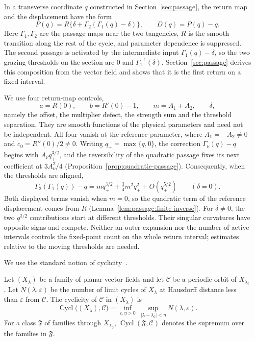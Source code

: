 In a transverse coordinate $q$ constructed in Section~\ref{sec:passage}, the
return map and the displacement have the form
\[
 P(q)=R\{\delta+\Gamma_2(\Gamma_1(q)-\delta)\},
 \qquad D(q)=P(q)-q.
\]
Here $\Gamma_1,\Gamma_2$ are the passage maps near the two tangencies, $R$ is
the smooth transition along the rest of the cycle, and parameter dependence is
suppressed. The second passage is activated by the intermediate input
$\Gamma_1(q)-\delta$, so the two grazing thresholds on the section are $0$ and
$\Gamma_1^{-1}(\delta)$. Section~\ref{sec:passage} derives this composition
from the vector field and shows that it is the first return on a fixed
interval.

We use four return-map controls,
\[
 a=R(0),\qquad b=R'(0)-1,\qquad m=A_1+A_2,\qquad\delta,
\]
namely the offset, the multiplier defect, the strength sum and the threshold
separation. They are smooth functions of the physical parameters and need not
be independent. All four vanish at the reference parameter, where $A_1=-A_2\ne0$
and $c_0=R''(0)/2\ne0$. Writing $q_+=\max\{q,0\}$, the correction
$\Gamma_\nu(q)-q$ begins with $A_\nu q_+^{3/2}$, and the reversibility of the
quadratic passage fixes its next coefficient at $3A_\nu^2/4$
(Proposition~\ref{prop:quadratic-passage}). Consequently, when the thresholds
are aligned,
\[
 \Gamma_2(\Gamma_1(q))-q
 =mq_+^{3/2}+\tfrac34m^2q_+^2+O(q_+^{5/2})
 \qquad(\delta=0).
\]
Both displayed terms vanish when $m=0$, so the quadratic term of the reference
displacement comes from $R$ (Lemma~\ref{lem:passage:finite-inverse}). For
$\delta\ne0$, the two $q^{3/2}$ contributions start at different thresholds.
Their singular curvatures have opposite signs and compete. Neither an outer
expansion nor the number of active intervals controls the fixed-point count
on the whole return interval; estimates relative to the moving thresholds
are needed.

We use the standard notion of cyclicity~\cite{roussarie1998}.

\begin{definition}[Cyclicity]\label{def:cyclicity}
Let $(X_\lambda)$ be a family of planar vector fields and let $\mathcal C$ be a
periodic orbit of $X_{\lambda_0}$. Let $N(\lambda,\varepsilon)$ be the number
of limit cycles of $X_\lambda$ at Hausdorff distance less than $\varepsilon$
from $\mathcal C$. The cyclicity of $\mathcal C$ in $(X_\lambda)$ is
\[
 \operatorname{Cycl}\bigl((X_\lambda),\mathcal C\bigr)
=\inf_{\varepsilon,\eta>0}\ \sup_{|\lambda-\lambda_0|<\eta}N(\lambda,\varepsilon).
\]
For a class $\mathfrak F$ of families through
$X_{\lambda_0}$, $\operatorname{Cycl}(\mathfrak F,\mathcal C)$ denotes the supremum
over the families in $\mathfrak F$.
\end{definition}

